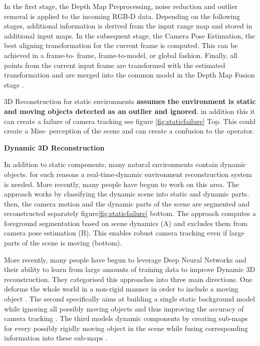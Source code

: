 In the first stage, the Depth Map Preprocessing, noise reduction and outlier removal is applied to the incoming RGB-D data. Depending on the following stages, additional information is derived from the input range map and stored in additional input maps. In the subsequent stage, the Camera Pose Estimation, the best aligning transformation for the current frame is computed. This can be achieved in a frame-to- frame, frame-to-model, or global fashion. Finally, all points from the current input frame are transformed with the estimated transformation and are merged into the common model in the Depth Map Fusion stage \cite{Zollhofer2018}.

3D Reconstruction for static environments \textbf{assumes the environment is static and moving objects detected as an outlier and ignored}. in addition this it can create a failure of camera tracking see figure \ref{fig:staticfailure} Top. This could create a Miss- perception of the scene and can create a confusion to the operator.

\textbf{Dynamic 3D Reconstruction}

In addition to static components, many natural environments contain dynamic objects. for such reasons a real-time-dynamic environment reconstruction system is needed. More recently, many people have begun to work on this area. The approach works by classifying the dynamic scene into static and dynamic parts. then, the camera motion and the dynamic parts of the scene are segmented and reconstructed separately figure\ref{fig:staticfailure} bottom. The approach \cite{Keller:2013:RRD:2544744.2544784} computes a foreground segmentation based on scene dynamics (A) and excludes them from camera pose estimation (B). This enables robust camera tracking even if large parts of the scene is moving (bottom). 

More recently, many people have begun to leverage Deep Neural Networks and their ability to learn from large amounts of training data to improve Dynamic 3D reconstruction. They categorised this approaches into three main directions. One deforms the whole world in a non-rigid manner in order to include a moving object \cite{newcombe2015dynamicfusion}. The second specifically aims at building a single static background model while ignoring all possibly moving objects and thus improving the accuracy of camera tracking \cite{jaimez2017fast} \cite{scona2018staticfusion} \cite{barnes2018driven}\cite{bescos2018dynaslam}. The third models dynamic components by creating sub-maps for every possibly rigidly moving object in the scene while fusing corresponding information into these sub-maps \cite{runz2017co} \cite{barsan2018robust}\cite{runz2018maskfusion} \cite{xu2019mid} \cite{narita2019panopticfusion} \cite{ miksik2019live} \cite{strecke2019fusion} \cite{hachiuma2019detectfusion}.

